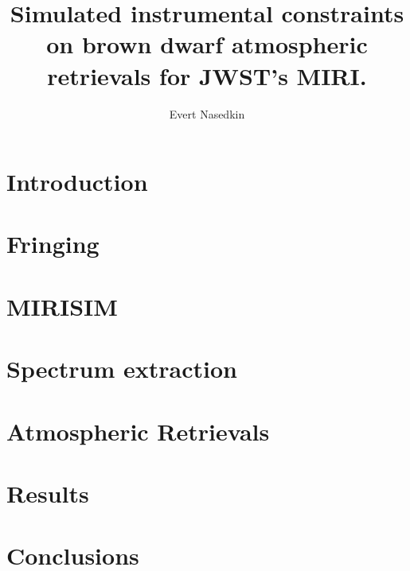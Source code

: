 \documentclass[]{article}
\title{Simulated instrumental constraints on brown dwarf atmospheric retrievals for JWST's MIRI.}
\author{Evert Nasedkin}
\begin{document}
\maketitle

\begin{abstract}

\end{abstract}

\section{Introduction}
\section{Fringing}
\section{MIRISIM}
\section{Spectrum extraction}
\section{Atmospheric Retrievals}
\section{Results}
\section{Conclusions}



\end{document}
